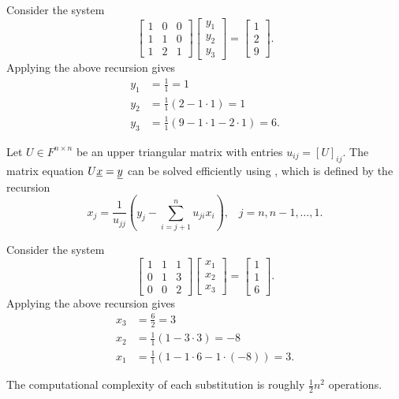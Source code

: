 \begin{example}
Consider the system
\begin{equation*}
\begin{bmatrix} 1 & 0 & 0 \\ 1 & 1 & 0 \\ 1 & 2 & 1 \end{bmatrix}
\begin{bmatrix} y_1 \\ y_2 \\ y_3 \end{bmatrix}
= \begin{bmatrix} 1 \\ 2 \\ 9 \end{bmatrix} .
\end{equation*}
Applying the above recursion gives
\begin{align*}
y_1 & = \frac{1}{1}  = 1 \\
y_2 & = \frac{1}{1} (2 - 1\cdot 1)  = 1 \\
y_3 & = \frac{1}{1} (9 - 1\cdot 1 - 2\cdot 1) = 6.
\end{align*}
\end{example}

Let $U \in F^{n \times n}$ be an upper triangular matrix with entries $u_{ij} = [ U ]_{ij}$.
The matrix equation $U \underline{x} = \underline{y}$ can be solved efficiently using , which is defined by the recursion
\begin{equation*}
x_j = \frac{1}{u_{jj}} \left( y_j - \sum_{i=j+1}^{n} u_{ji} x_i \right), \;\;\; j=n,n-1,\ldots,1.
\end{equation*}

\begin{example}
Consider the system
\begin{equation*}
\begin{bmatrix} 1 & 1 & 1 \\ 0 & 1 & 3 \\ 0 & 0 & 2 \end{bmatrix}
\begin{bmatrix} x_1 \\ x_2 \\ x_3 \end{bmatrix}
= \begin{bmatrix} 1 \\ 1 \\ 6 \end{bmatrix} .
\end{equation*}
Applying the above recursion gives
\begin{align*}
x_3 & = \frac{6}{2} = 3 \\
x_2 & = \frac{1}{1} (1 - 3\cdot 3) = -8 \\
x_1 & = \frac{1}{1} (1 - 1\cdot 6 - 1\cdot (-8) ) = 3. 
\end{align*}
\end{example}
The computational complexity of each substitution is roughly $\frac{1}{2} n^2$ operations.


